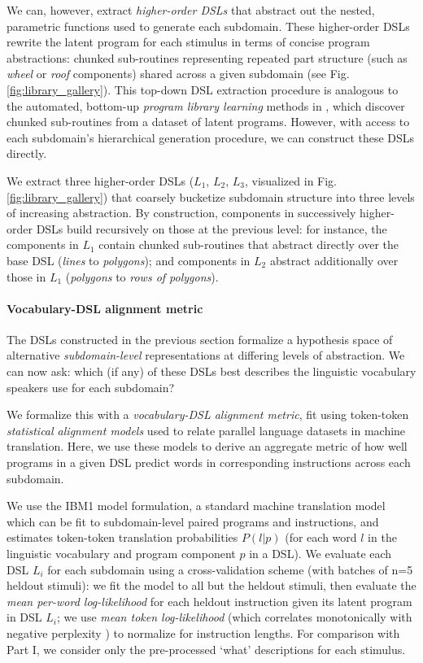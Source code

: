 \documentclass[10pt,letterpaper]{article}
\begin{document}
We can, however, extract \textit{higher-order DSLs} that abstract out the nested, parametric functions used to generate each subdomain. These higher-order DSLs rewrite the latent program for each stimulus in terms of concise program abstractions: chunked sub-routines representing repeated part structure (such as \textit{wheel} or \textit{roof} components) shared across a given subdomain
(see Fig. \ref{fig:library_gallery}). This top-down DSL extraction procedure is analogous to the automated, bottom-up \textit{program library learning} methods in , which discover chunked sub-routines from a dataset of latent programs. However, with access to each subdomain's hierarchical generation procedure, we can construct these DSLs directly. 

We extract three higher-order DSLs ($L_1$, $L_2$, $L_3$, visualized in Fig. \ref{fig:library_gallery}) that coarsely bucketize subdomain structure into three levels of increasing abstraction. By construction, components in successively higher-order DSLs build recursively on those at the previous level: for instance, the components in $L_1$ contain chunked sub-routines that abstract directly over the base DSL (\textit{lines} to \textit{polygons}); and components in $L_2$ abstract additionally over those in $L_1$ (\textit{polygons} to \textit{rows of polygons}). 

\paragraph{Vocabulary-DSL alignment metric}
The DSLs constructed in the previous section formalize a hypothesis space of alternative \textit{subdomain-level} representations at differing levels of abstraction. We can now ask: which (if any) of these DSLs best describes the linguistic vocabulary speakers use for each subdomain? 

We formalize this with a \textit{vocabulary-DSL alignment metric}, fit using token-token \textit{statistical alignment models} used to relate parallel language datasets in machine translation. Here, we use these models to derive an aggregate metric of how well programs in a given DSL predict words in corresponding instructions across each subdomain.

We use the IBM1  model formulation, a standard machine translation model which can be fit to subdomain-level paired programs and instructions, and estimates token-token translation probabilities $P(l|p)$ (for each word $l$ in the linguistic vocabulary and program component $p$ in a DSL). We evaluate each DSL $L_i$ for each subdomain using a cross-validation scheme (with batches of n=5 heldout stimuli): we fit the model to all but the heldout stimuli, then evaluate the \textit{mean per-word log-likelihood} for each heldout instruction given its latent program in DSL $L_i$; we use \textit{mean token log-likelihood} (which correlates monotonically with negative {perplexity} ) to normalize for instruction lengths. For comparison with Part I, we consider only the pre-processed `what' descriptions for each stimulus.
\end{document}
